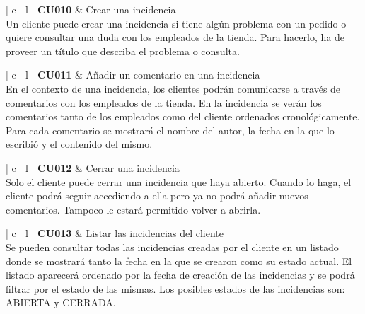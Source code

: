 \documentclass[11pt,spanish,listoffigures]{tfgetsinf}
\begin{document}
\begin{center}
\begin{tabular}{ | c | l | }
\hline
\textbf{ CU010 } & Crear una incidencia \\
\hline
{}
{
Un cliente puede crear una incidencia si tiene algún problema con un pedido o quiere consultar una duda con los empleados de la tienda. Para hacerlo, ha de proveer un título que describa el problema o consulta.
} \\
\hline
\end{tabular}
\end{center}

\begin{center}
\begin{tabular}{ | c | l | }
\hline
\textbf{ CU011 } & Añadir un comentario en una incidencia \\
\hline
{}
{
En el contexto de una incidencia, los clientes podrán comunicarse a través de comentarios con los empleados de la tienda. En la incidencia se verán los comentarios tanto de los empleados como del cliente ordenados cronológicamente. Para cada comentario se mostrará el nombre del autor, la fecha en la que lo escribió y el contenido del mismo.
} \\
\hline
\end{tabular}
\end{center}

\begin{center}
\begin{tabular}{ | c | l | }
\hline
\textbf{ CU012 } & Cerrar una incidencia \\
\hline
{}
{
Solo el cliente puede cerrar una incidencia que haya abierto. Cuando lo haga, el cliente podrá seguir accediendo a ella pero ya no podrá añadir nuevos comentarios. Tampoco le estará permitido volver a abrirla.
} \\
\hline
\end{tabular}
\end{center}

\begin{center}
\begin{tabular}{ | c | l | }
\hline
\textbf{ CU013 } & Listar las incidencias del cliente \\
\hline
{}
{
Se pueden consultar todas las incidencias creadas por el cliente en un listado donde se mostrará tanto la fecha en la que se crearon como su estado actual. El listado aparecerá ordenado por la fecha de creación de las incidencias y se podrá filtrar por el estado de las mismas. Los posibles estados de las incidencias son: ABIERTA y CERRADA.
} \\
\hline
\end{tabular}
\end{center}
\end{document}
